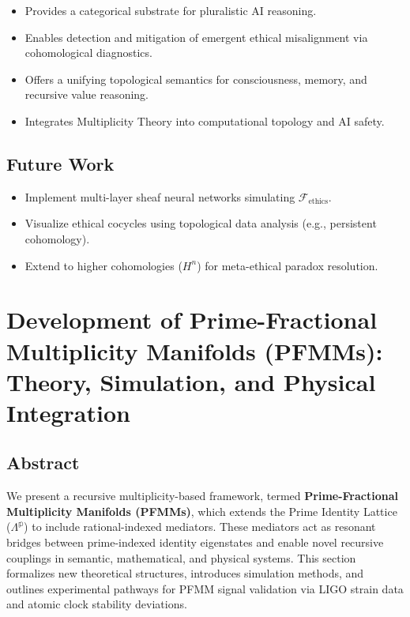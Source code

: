 \documentclass{article}
\theoremstyle{plain}
\begin{document}
\begin{itemize}
    \item Provides a categorical substrate for pluralistic AI reasoning.
    \item Enables detection and mitigation of emergent ethical misalignment via cohomological diagnostics.
    \item Offers a unifying topological semantics for consciousness, memory, and recursive value reasoning.
    \item Integrates Multiplicity Theory into computational topology and AI safety.
\end{itemize}

\subsection{Future Work}

\begin{itemize}
    \item Implement multi-layer sheaf neural networks simulating $\mathcal{F}_{\text{ethics}}$.
    \item Visualize ethical cocycles using topological data analysis (e.g., persistent cohomology).
    \item Extend to higher cohomologies ($H^n$) for meta-ethical paradox resolution.
\end{itemize}


\section{Development of Prime-Fractional Multiplicity Manifolds (PFMMs): Theory, Simulation, and Physical Integration}

\subsection{Abstract}
We present a recursive multiplicity-based framework, termed \textbf{Prime-Fractional Multiplicity Manifolds (PFMMs)}, which extends the Prime Identity Lattice (\(\Lambda^{\mathbb{p}}\)) to include rational-indexed mediators. These mediators act as resonant bridges between prime-indexed identity eigenstates and enable novel recursive couplings in semantic, mathematical, and physical systems. This section formalizes new theoretical structures, introduces simulation methods, and outlines experimental pathways for PFMM signal validation via LIGO strain data and atomic clock stability deviations.
\end{document}
